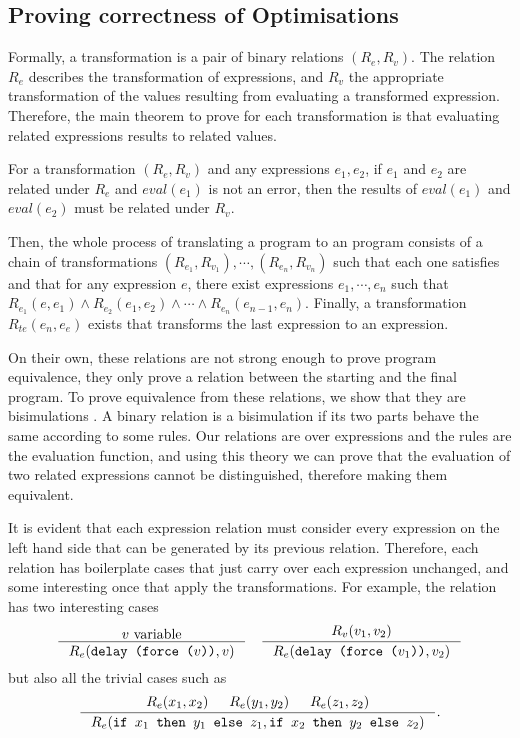 \subsection{Proving correctness of \ThunkLang{} Optimisations}

Formally, a transformation is a pair of binary relations $(R_e,R_v)$. The
relation $R_e$ describes the transformation of expressions, and $R_v$ the
appropriate transformation of the values resulting from evaluating a transformed
expression. Therefore, the main theorem to prove for each transformation is that
evaluating related expressions results to related values.

\begin{theorem}
  \label{thm:releval}
  For a transformation $(R_e,R_v)$ and any expressions $e_1,e_2$, if $e_1$ and
  $e_2$ are related under $R_e$ and $eval(e_1)$ is not an error, then the
  results of $eval(e_1)$ and $eval(e_2)$ must be related under $R_v$.
\end{theorem}

Then, the whole process of translating a \ThunkLang{} program to an \EnvLang{}
program consists of a chain of transformations $(R_{e_1},R_{v_1}), \cdots,
(R_{e_n},R_{v_n})$ such that each one satisfies  and that
for any \ThunkLang{} expression $e$, there exist \ThunkLang{} expressions
$e_1,\cdots,e_n$ such that $R_{e_1}(e,e_1) \land R_{e_2}(e_1,e_2) \land \cdots
\land R_{e_n}(e_{n-1},e_n)$. Finally, a transformation $R_{te}(e_n,e_e)$ exists
that transforms the last \ThunkLang{} expression to an \EnvLang{} expression.

On their own, these relations are not strong enough to prove program
equivalence, they only prove a relation between the starting and the final
program. To prove equivalence from these relations, we show that they are
bisimulations \cite{howe1996proving}. A binary relation is a bisimulation if its
two parts behave the same according to some rules. Our relations are over
\ThunkLang{} expressions and the rules are the evaluation function, and using
this theory we can prove that the evaluation of two related expressions cannot
be distinguished, therefore making them equivalent.

It is evident that each expression relation must consider every expression on
the left hand side that can be generated by its previous relation. Therefore,
each relation has boilerplate cases that just carry over each expression
unchanged, and some interesting once that apply the transformations. For
example, the  relation has two interesting cases
\[
\inference{v\ \text{variable}}{R_e(\lit{delay (force ($v$))},v)}
\quad
\inference{R_v(v_1,v_2)}{R_e(\lit{delay (force ($v_1$))},v_2)}
\]
but also all the trivial
cases such as \[\inference{
  R_e(x_1, x_2)&
  R_e(y_1, y_2)&
  R_e(z_1, z_2)}
{R_e(\lit{if } x_1 \lit{ then } y_1 \lit{ else } z_1,
\lit{if } x_2 \lit{ then } y_2 \lit{ else } z_2)}.\]

